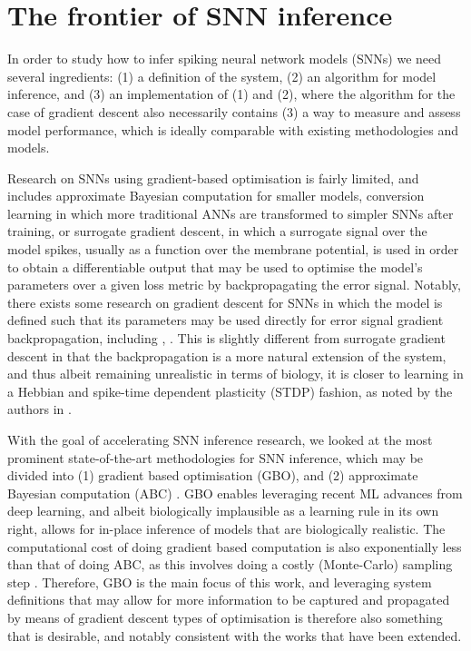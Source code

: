 \documentclass[mphil,deptreport,ianc]{infthesis} %
\begin{document}
\chapter{The frontier of SNN inference}\label{chpt:frontier}

In order to study how to infer spiking neural network models (SNNs) we need several ingredients: (1) a definition of the system, (2) an algorithm for model inference, and (3) an implementation of (1) and (2), where the algorithm for the case of gradient descent also necessarily contains (3) a way to measure and assess model performance, which is ideally comparable with existing methodologies and models.

Research on SNNs using gradient-based optimisation is fairly limited, and includes approximate Bayesian computation for smaller models, conversion learning in which more traditional ANNs are transformed to simpler SNNs after training, or surrogate gradient descent, in which a surrogate signal over the model spikes, usually as a function over the membrane potential, is used in order to obtain a differentiable output that may be used to optimise the model's parameters over a given loss metric by backpropagating the error signal. Notably, there exists some research on gradient descent for SNNs in which the model is defined such that its parameters may be used directly for error signal gradient backpropagation, including \cite{Huh2017}, \cite{Rene2020}. This is slightly different from surrogate gradient descent in that the backpropagation is a more natural extension of the system, and thus albeit remaining unrealistic in terms of biology, it is closer to learning in a Hebbian and spike-time dependent plasticity (STDP) fashion, as noted by the authors in \cite{Huh2017}.

With the goal of accelerating SNN inference research, we looked at the most prominent state-of-the-art methodologies for SNN inference, which may be divided into (1) gradient based optimisation (GBO), and (2) approximate Bayesian computation (ABC) \cite{Lueckmann2018, Rene2020, Cranmer2020a, Lueckmann2021}.
GBO enables leveraging recent ML advances from deep learning, and albeit biologically implausible as a learning rule in its own right, allows for in-place inference of models that are biologically realistic. The computational cost of doing gradient based computation is also exponentially less than that of doing ABC, as this involves doing a costly (Monte-Carlo) sampling step \cite{Rene2020}.
Therefore, GBO is the main focus of this work, and leveraging system definitions that may allow for more information to be captured and propagated by means of gradient descent types of optimisation is therefore also something that is desirable, and notably consistent with the works that have been extended.
\end{document}
